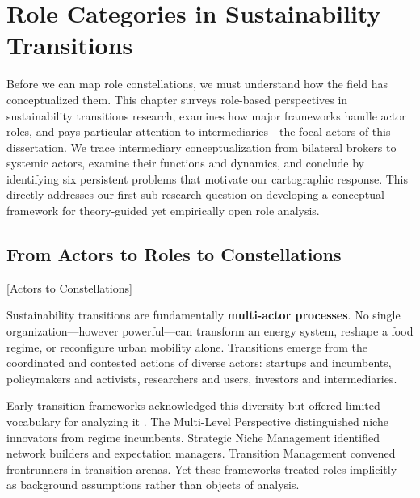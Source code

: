 \documentclass[../main.tex]{subfiles}
\begin{document}
\chapter{Role Categories in Sustainability Transitions}
\margintoc

\begin{chapteroverview}
Before we can map role constellations, we must understand how the field has conceptualized them. This chapter surveys role-based perspectives in sustainability transitions research, examines how major frameworks handle actor roles, and pays particular attention to intermediaries---the focal actors of this dissertation. We trace intermediary conceptualization from bilateral brokers to systemic actors, examine their functions and dynamics, and conclude by identifying six persistent problems that motivate our cartographic response. This directly addresses our first sub-research question on developing a conceptual framework for theory-guided yet empirically open role analysis.
\end{chapteroverview}


\section{From Actors to Roles to Constellations}[Actors to Constellations]

Sustainability transitions are fundamentally \textbf{multi-actor processes}. No single organization---however powerful---can transform an energy system, reshape a food regime, or reconfigure urban mobility alone. Transitions emerge from the coordinated and contested actions of diverse actors: startups and incumbents, policymakers and activists, researchers and users, investors and intermediaries.

Early transition frameworks acknowledged this diversity but offered limited vocabulary for analyzing it \cite{markard2012sustainability}. The Multi-Level Perspective distinguished niche innovators from regime incumbents. Strategic Niche Management identified network builders and expectation managers. Transition Management convened frontrunners in transition arenas. Yet these frameworks treated roles implicitly---as background assumptions rather than objects of analysis.
\end{document}
